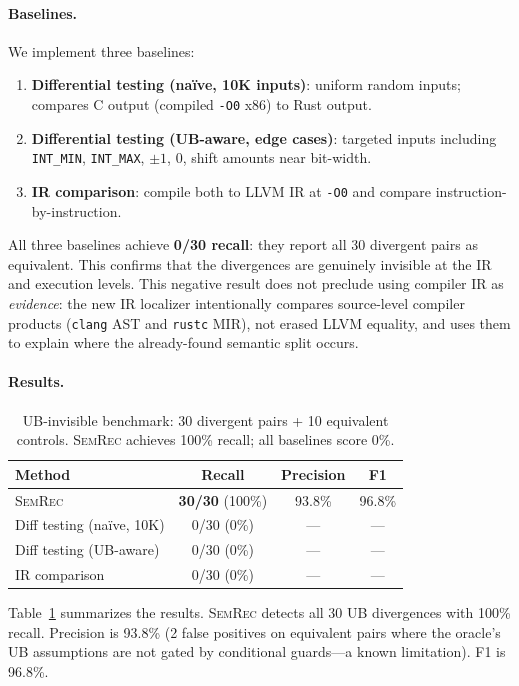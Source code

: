 \documentclass[10pt,a4paper]{article}
\begin{document}
\paragraph{Baselines.}
We implement three baselines:
\begin{enumerate}[nosep]
  \item \textbf{Differential testing (na\"ive, 10K inputs)}: uniform
    random inputs; compares C output (compiled \texttt{-O0} x86) to
    Rust output.
  \item \textbf{Differential testing (UB-aware, edge cases)}: targeted
    inputs including \texttt{INT\_MIN}, \texttt{INT\_MAX}, $\pm1$, $0$,
    shift amounts near bit-width.
  \item \textbf{IR comparison}: compile both to LLVM IR at \texttt{-O0}
    and compare instruction-by-instruction.
\end{enumerate}
All three baselines achieve \textbf{0/30 recall}: they report all 30
divergent pairs as equivalent.  This confirms that the divergences are
genuinely invisible at the IR and execution levels.
This negative result does not preclude using compiler IR as \emph{evidence}: the
new IR localizer intentionally compares source-level compiler products
(\texttt{clang} AST and \texttt{rustc} MIR), not erased LLVM equality, and uses
them to explain where the already-found semantic split occurs.

\paragraph{Results.}

\begin{table}[t]
\centering
\small
\caption{UB-invisible benchmark: 30 divergent pairs + 10 equivalent
controls.  \textsc{SemRec} achieves 100\% recall; all baselines score
0\%.}
\label{tab:ub-invisible}
\begin{tabular}{@{}lccc@{}}
\toprule
Method & Recall & Precision & F1 \\
\midrule
\textsc{SemRec} & \textbf{30/30} (100\%) & 93.8\% & 96.8\% \\
Diff testing (na\"ive, 10K) & 0/30 (0\%) & --- & --- \\
Diff testing (UB-aware) & 0/30 (0\%) & --- & --- \\
IR comparison & 0/30 (0\%) & --- & --- \\
\bottomrule
\end{tabular}
\end{table}

Table~\ref{tab:ub-invisible} summarizes the results.  \textsc{SemRec}
detects all 30 UB divergences with 100\% recall.  Precision is 93.8\%
(2 false positives on equivalent pairs where the oracle's UB
assumptions are not gated by conditional guards---a known limitation).
F1 is 96.8\%.
\end{document}

